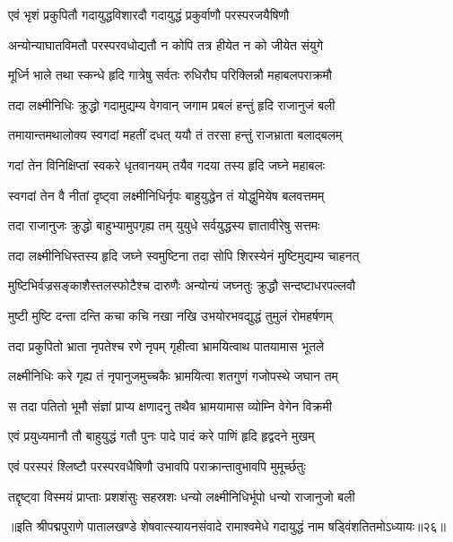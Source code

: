 \twolineshloka
{एवं भृशं प्रकुपितौ गदायुद्धविशारदौ}
{गदायुद्धं प्रकुर्वाणौ परस्परजयैषिणौ}%

\twolineshloka
{अन्योन्याघातविमतौ परस्परवधोद्यतौ}
{न कोपि तत्र हीयेत न को जीयेत संयुगे}%

\twolineshloka
{मूर्ध्नि भाले तथा स्कन्धे हृदि गात्रेषु सर्वतः}
{रुधिरौघ परिक्लिन्नौ महाबलपराक्रमौ}%

\twolineshloka
{तदा लक्ष्मीनिधिः क्रुद्धो गदामुद्यम्य वेगवान्}
{जगाम प्रबलं हन्तुं हृदि राजानुजं बली}%

\twolineshloka
{तमायान्तमथालोक्य स्वगदां महतीं दधत्}
{ययौ तं तरसा हन्तुं राजभ्राता बलाद्बलम्}%

\twolineshloka
{गदां तेन विनिक्षिप्तां स्वकरे धृतवानयम्}
{तयैव गदया तस्य हृदि जघ्ने महाबलः}%

\twolineshloka
{स्वगदां तेन वै नीतां दृष्ट्वा लक्ष्मीनिधिर्नृपः}
{बाहुयुद्धेन तं योद्धुमियेष बलवत्तमम्}%

\twolineshloka
{तदा राजानुजः क्रुद्धो बाहुभ्यामुपगृह्य तम्}
{युयुधे सर्वयुद्धस्य ज्ञातावीरेषु सत्तमः}%

\twolineshloka
{तदा लक्ष्मीनिधिस्तस्य हृदि जघ्ने स्वमुष्टिना}
{तदा सोपि शिरस्येनं मुष्टिमुद्यम्य चाहनत्}%

\twolineshloka
{मुष्टिभिर्वज्रसङ्काशैस्तलस्फोटैश्च दारुणैः}
{अन्योन्यं जघ्नतुः क्रुद्धौ सन्दष्टाधरपल्लवौ}%

\twolineshloka
{मुष्टी मुष्टि दन्ता दन्ति कचा कचि नखा नखि}
{उभयोरभवद्युद्धं तुमुलं रोमहर्षणम्}%

\twolineshloka
{तदा प्रकुपितो भ्राता नृपतेश्च रणे नृपम्}
{गृहीत्वा भ्रामयित्वाथ पातयामास भूतले}%

\twolineshloka
{लक्ष्मीनिधिः करे गृह्य तं नृपानुजमुच्चकैः}
{भ्रामयित्वा शतगुणं गजोपस्थे जघान तम्}%

\twolineshloka
{स तदा पतितो भूमौ संज्ञां प्राप्य क्षणादनु}
{तथैव भ्रामयामास व्योम्नि वेगेन विक्रमी}%

\twolineshloka
{एवं प्रयुध्यमानौ तौ बाहुयुद्धं गतौ पुनः}
{पादे पादं करे पाणिं हृदि हृद्वदने मुखम्}%

\twolineshloka
{एवं परस्परं श्लिष्टौ परस्परवधैषिणौ}
{उभावपि पराक्रान्तावुभावपि मुमूर्च्छतुः}%

\twolineshloka
{तद्दृष्ट्वा विस्मयं प्राप्ताः प्रशशंसुः सहस्रशः}
{धन्यो लक्ष्मीनिधिर्भूपो धन्यो राजानुजो बली}%

॥इति श्रीपद्मपुराणे पातालखण्डे शेषवात्स्यायनसंवादे रामाश्वमेधे गदायुद्धं नाम षड्विंशतितमोऽध्यायः॥२६॥


